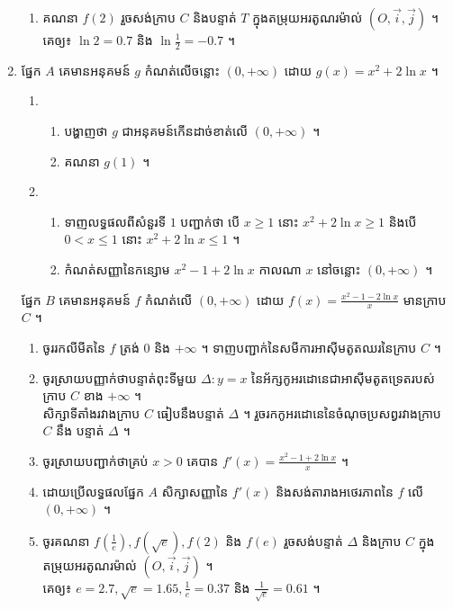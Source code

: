 \documentclass{officialexam}
\begin{document}
\begin{enumerate}[I]
\begin{enumerate}[k]
		\item គណនា $f(2)$ រួចសង់ក្រាប $C$ និងបន្ទាត់ $T$ ក្នុងតម្រុយអរតូណរម៉ាល់ $(O,\vec{i}, \vec{j})$ ។\\
		គេឲ្យ៖ $\ln2=0.7 $ និង $\ln\frac{1}{2}=-0.7$ ។
	\end{enumerate}
	\item {\color{khtug} \sffamily ផ្នែក $A$} គេមានអនុគមន៍ $g$ កំណត់លើចន្លោះ $(0, +\infty)$ ដោយ $g(x)=x^2+2\ln x$ ។
	\begin{enumerate}[1]
		\item \begin{enumerate}[k]
			\item បង្ហាញថា $g$ ជាអនុគមន៍កើនដាច់ខាត់លើ $(0, +\infty)$ ។
			\item គណនា $g(1)$ ។
		\end{enumerate}
		\item \begin{enumerate}[k]
			\item ទាញលទ្ធផលពីសំនួរទី $1$ បញ្ជាក់ថា បើ $x\geq1$ នោះ $x^2+2\ln x\geq1$ និងបើ $0<x\leq1$ នោះ $x^2+2\ln x\leq1$ ។ 
			\item កំណត់សញ្ញានៃកន្សោម $x^2-1+2\ln x$ កាលណា $x$ នៅចន្លោះ $(0,+\infty)$ ។
		\end{enumerate}
	\end{enumerate}
	{\color{khtug} \sffamily ផ្នែក $B$} គេមានអនុគមន៍ $f$ កំណត់លើ $(0,+\infty)$ ដោយ $f(x)=\frac{x^2-1-2\ln x}{x}$ មានក្រាប $C$ ។
	\begin{enumerate}[k]
		\item ចូររកលីមីតនៃ $f$ ត្រង់ $0$ និង $+\infty$ ។ ទាញបញ្ជាក់នៃសមីការអាស៊ីមតូតឈរនៃក្រាប $C$ ។
		\item ចូរស្រាយបញ្ញាក់ថាបន្ទាត់ពុះទីមួយ $\Delta : y=x$ នៃអ័ក្សកូអរដោនេជាអាស៊ីមតូតទ្រេតរបស់ក្រាប $C$ ខាង $+\infty$ ។ \\សិក្សាទីតាំងរវាងក្រាប $C$ ធៀបនឹងបន្ទាត់ $\Delta$ ។ រួចរកកូអរដោនេនៃចំណុចប្រសព្វរវាងក្រាប $C$ នឹង បន្ទាត់ $\Delta$ ។
		\item ចូរស្រាយបញ្ជាក់ថាគ្រប់ $x>0$ គេបាន $f'(x)=\frac{x^2-1+2\ln x}{x}$ ។
		\item ដោយប្រើលទ្ធផលផ្នែក $A$ សិក្សាសញ្ញានៃ $f'(x)$ និងសង់តារាងអថេរភាពនៃ $f$ លើ $(0, +\infty)$ ។
		\item ចូរគណនា $f\left(\frac{1}{e}\right), f\left(\sqrt{e}\right), f(2)$ និង $f(e)$ រួចសង់បន្ទាត់ $\Delta$ និងក្រាប $C$ ក្នុងតម្រុយអរតូណរម៉ាល់ $(O, \vec{i}, \vec{j})$ ។\\
		គេឲ្យ៖ $e=2.7, \sqrt{e}=1.65, \frac{1}{e}=0.37$ និង $ \frac{1}{\sqrt{e}}=0.61$ ។
	\end{enumerate}
\end{enumerate}
\end{document}
